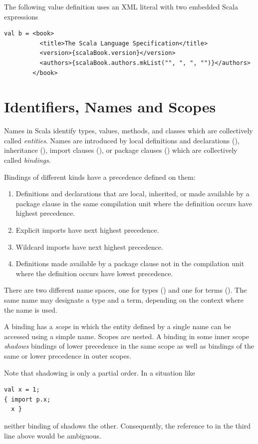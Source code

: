 \example 
The following value definition uses an XML literal with two embedded
Scala expressions
\begin{lstlisting}
val b = <book>
          <title>The Scala Language Specification</title>
          <version>{scalaBook.version}</version>
          <authors>{scalaBook.authors.mkList("", ", ", "")}</authors>
        </book>
\end{lstlisting}

\chapter{\label{sec:names}Identifiers, Names and Scopes}

Names in Scala identify types, values, methods, and classes which are
collectively called {\em entities}. Names are introduced by local
definitions and declarations (), inheritance (),
import clauses (), or package clauses
() which are collectively called {\em
bindings}.

Bindings of different kinds have a precedence defined on them:
\begin{enumerate} 
\item Definitions and declarations that are local, inherited, or made 
available by a package clause in the same compilation unit where the 
definition occurs have highest precedence. 
\item Explicit imports have next highest precedence.
\item Wildcard imports  have next highest precedence.
\item Definitions made available by a package clause not in the 
compilation unit where the definition occurs have lowest precedence.
\end{enumerate} 

There are two different name spaces, one for types ()
and one for terms ().  The same name may designate a
type and a term, depending on the context where the name is used.

A binding has a {\em scope} in which the entity defined by a single
name can be accessed using a simple name. Scopes are nested.  A binding
in some inner scope {\em shadows} bindings of lower precedence in the
same scope as well as bindings of the same or lower precedence in outer
scopes. 

Note that shadowing is only a partial order. In a situation like
\begin{lstlisting}
val x = 1;
{ import p.x; 
  x }
\end{lstlisting}
neither binding of  shadows the other. Consequently, the
reference to  in the third line above would be ambiguous.

